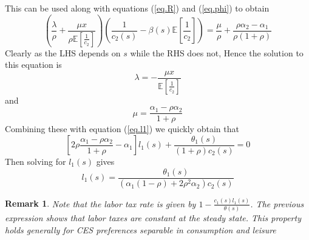 \documentclass[thmsb,11pt]{article}
\newtheorem{remark}{Remark}
\begin{document}
{\begin{equation*}
\end{equation*}%
This can be used along with equations (\ref{eq.R}) and (\ref{eq.phi}) to
obtain
\begin{equation*}
\left(\frac\lambda \rho+\frac{\mu x}{\rho\mathbb{E}[\frac1{c_2}]}%
\right)\left(\frac1{c_2(s)}-\beta(s)\mathbb{E}\left[\frac1{c_2}\right]%
\right) = \frac{\mu}{\rho}+\frac{\rho\alpha_2-\alpha_1}{\rho(1+\rho)}
\end{equation*}
Clearly as the LHS depends on $s$ while the RHS does not, Hence the solution to
this equation is
\begin{equation}
\lambda = - \frac{\mu x}{\mathbb{E}[\frac1{c_2}]}
\end{equation}%
and
\begin{equation}
\mu = \frac{\alpha_1-\rho\alpha_2}{1+\rho}  \label{eq.mu}
\end{equation}
Combining these with equation (\ref{eq.l1}) we quickly obtain that
\begin{equation*}
\left[2\rho\frac{\alpha_1-\rho\alpha_2}{1+\rho}-\alpha_1\right]%
l_1(s)+\frac{\theta_1(s)}{\left(1+\rho\right)c_2(s)} = 0
\end{equation*}%
Then solving for $l_1(s)$ gives
\begin{equation*}
l_1(s) = \frac{\theta_1(s)}{\left(\alpha_1(1-\rho)+2\rho^2\alpha_2\right)c_2(s)}
\end{equation*}

\begin{remark}
Note that the labor tax rate is given by $1-\frac{c_1(s)l_1(s)}{\theta(s)}$. The previous expression shows that labor taxes are constant at the steady state. This property holds generally for CES preferences separable in consumption and leisure
\end{remark}

}
\end{document}
